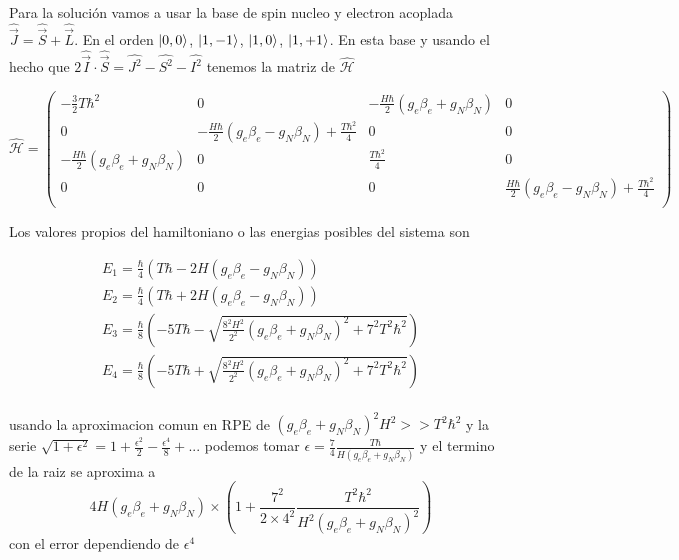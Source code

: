 \documentclass[%
amssymb,prb,aps,superscriptaddress]{revtex4}
\begin{document}
Para la solución vamos a usar la base de spin nucleo y electron acoplada $\hat{\vec{J}} = \hat{\vec{S}} + \hat{\vec{L}}$. En el orden $\ket{0,0}$, $\ket{1,-1}$, $\ket{1,0}$, $\ket{1,+1}$. En esta base y usando el hecho que $ 2 \hat{\vec{I}} \cdot \hat{\vec{S}} = \hat{J^2} - \hat{S^2} - \hat{I^2} $ tenemos la matriz de $\mathcal{\hat{H}}$

$$
\hat{\mathcal{H}} =     
\begin{pmatrix}

    -\frac{3}{2} T \hbar^2 & 0 & - \frac{H \hbar}{2} (g_e \beta_e + g_N \beta_N) & 0 \\

    0 & -\frac{H \hbar}{2} (g_e \beta_e - g_N \beta_N) + \frac{T \hbar^2}{4} & 0 & 0 \\

    - \frac{H \hbar}{2} (g_e \beta_e + g_N \beta_N) & 0 & \frac{T \hbar^2}{4} & 0 \\

    0 & 0 & 0 & \frac{H \hbar}{2} (g_e \beta_e - g_N \beta_N) + \frac{T \hbar^2}{4} \\

\end{pmatrix}
$$

Los valores propios del hamiltoniano o las energias posibles del sistema son

    \begin{align*}
        E_1 = \frac{\hbar}{4}(T \hbar - 2 H (g_e \beta_e - g_N \beta_N)) \\
        E_2 = \frac{\hbar}{4}(T \hbar + 2 H (g_e \beta_e - g_N \beta_N)) \\
        E_3 = \frac{\hbar}{8}\left(-5 T \hbar - \sqrt{\frac{8^2 H^2}{2^2} (g_e \beta_e + g_N \beta_N)^2 + 7^2 T^2 \hbar^2}\right) \\
        E_4 = \frac{\hbar}{8}\left(-5 T \hbar + \sqrt{\frac{8^2 H^2}{2^2} (g_e \beta_e + g_N \beta_N)^2 + 7^2 T^2 \hbar^2} \right) \\
    \end{align*}

usando la aproximacion comun en RPE de $ (g_e \beta_e + g_N \beta_N)^2 H^2 >> T^2 \hbar^2  $ y la serie $ \sqrt{1 + \epsilon^2} = 1+\frac{\epsilon^2}{2}-\frac{\epsilon^4}{8} + ... $ podemos tomar $ \epsilon = \frac{7}{4}\frac{T \hbar}{H(g_e \beta_e + g_N \beta_N)} $ y el termino de la raiz se aproxima a
$$ 4 H (g_e \beta_e + g_N \beta_N) \times \left(1 + \frac{7^2}{2 \times 4^2} \frac{T^2 \hbar^2}{H^2(g_e \beta_e + g_N \beta_N)^2} \right) $$ 
con el error dependiendo de $\epsilon^4$
\end{document}
